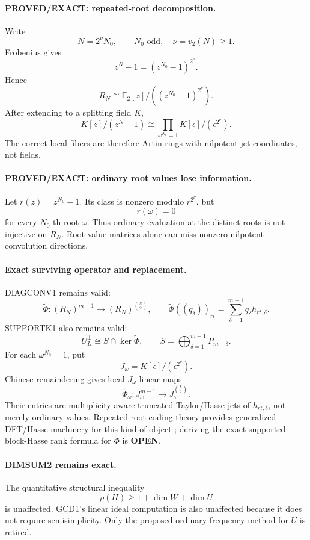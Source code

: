 \documentclass[11pt]{article}
\begin{document}
\paragraph{PROVED/EXACT: repeated-root decomposition.}
Write
\[
N=2^\nu N_0,\qquad N_0\text{ odd},\quad \nu=v_2(N)\ge1.
\]
Frobenius gives
\[
\boxed{z^N-1=(z^{N_0}-1)^{2^\nu}.}
\]
Hence
\[
\boxed{R_N\cong\mathbb F_2[z]/((z^{N_0}-1)^{2^\nu}).}
\]
After extending to a splitting field \(K\),
\[
\boxed{
K[z]/(z^N-1)\cong
\prod_{\omega^{N_0}=1}K[\epsilon]/(\epsilon^{2^\nu}).
}
\]
The correct local fibers are therefore Artin rings with nilpotent jet coordinates, not fields.

\paragraph{PROVED/EXACT: ordinary root values lose information.}
Let \(r(z)=z^{N_0}-1\). Its class is nonzero modulo \(r^{2^\nu}\), but
\[
r(\omega)=0
\]
for every \(N_0\)-th root \(\omega\). Thus ordinary evaluation at the distinct roots is not injective on \(R_N\). Root-value matrices alone can miss nonzero nilpotent convolution directions.

\paragraph{Exact surviving operator and replacement.}
DIAGCONV1 remains valid:
\[
\widetilde\Phi:(R_N)^{m-1}\to(R_N)^{\binom{k}{2}},
\qquad
\widetilde\Phi((q_\delta))_{rt}
=\sum_{\delta=1}^{m-1}q_\delta h_{rt,\delta}.
\]
SUPPORTK1 also remains valid:
\[
\boxed{
U_L^\perp\cong S\cap\ker\widetilde\Phi,\qquad
S=\bigoplus_{\delta=1}^{m-1}P_{m-\delta}.
}
\]
For each \(\omega^{N_0}=1\), put
\[
J_\omega=K[\epsilon]/(\epsilon^{2^\nu}).
\]
Chinese remaindering gives local \(J_\omega\)-linear maps
\[
\boxed{
\widetilde\Phi_\omega:J_\omega^{m-1}\to J_\omega^{\binom{k}{2}}.
}
\]
Their entries are multiplicity-aware truncated Taylor/Hasse jets of \(h_{rt,\delta}\), not merely ordinary values. Repeated-root coding theory provides generalized DFT/Hasse machinery for this kind of object \cite{LingNiederreiterSole,GenMS}; deriving the exact supported block-Hasse rank formula for \(\widetilde\Phi\) is \textbf{OPEN}.

\paragraph{DIMSUM2 remains exact.}
The quantitative structural inequality
\[
\boxed{\rho(H)\ge1+\dim W+\dim U}
\]
is unaffected. GCD1's linear ideal computation is also unaffected because it does not require semisimplicity. Only the proposed ordinary-frequency method for \(U\) is retired.
\end{document}
